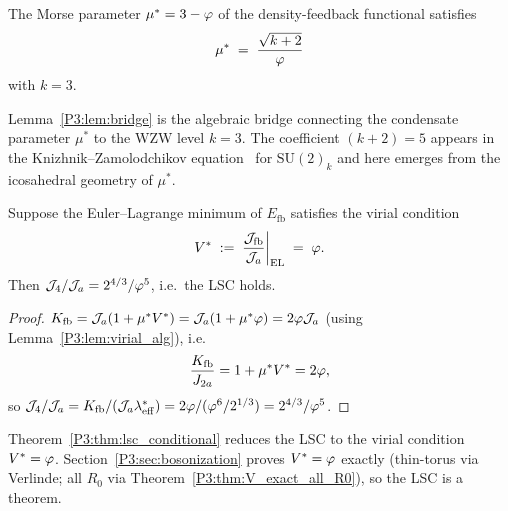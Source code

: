 \begin{lemma}
\label{P3:lem:bridge}
The Morse parameter $\mu^* = 3-\varphi$ of the density-feedback
functional satisfies
\begin{equation}
  \mu^* \;=\; \frac{\sqrt{k+2}}{\varphi}
  \label{P3:eq:bridge}
\end{equation}
with $k=3$.
\end{lemma}

\begin{remark}
\label{P3:rem:bridge_interpretation}
Lemma~\ref{P3:lem:bridge} is the algebraic bridge connecting the
condensate parameter $\mu^*$ to the WZW level $k=3$.
The coefficient $(k+2)=5$ appears in the Knizhnik--Zamolodchikov
equation~\cite{KZ1984} for $\mathrm{SU}(2)_k$ and here emerges
from the icosahedral geometry of $\mu^*$.
\end{remark}

\begin{theorem}
\label{P3:thm:lsc_conditional}
Suppose the Euler--Lagrange minimum of $E_{\mathrm{fb}}$ satisfies
the virial condition
\begin{equation}
  V^* \;:=\; \frac{\mathcal{J}_{\mathrm{fb}}}{\mathcal{J}_a}\bigg|_{\mathrm{EL}} \;=\; \varphi.
  \label{P3:eq:virial}
\end{equation}
Then $\mathcal{J}_4/\mathcal{J}_a = 2^{4/3}/\varphi^5$, i.e.\ the LSC holds.
\end{theorem}
\begin{proof}
$K_{\mathrm{fb}} = \mathcal{J}_a(1 + \mu^*V^*) = \mathcal{J}_a(1 + \mu^*\varphi) = 2\varphi\mathcal{J}_a$
(using Lemma~\ref{P3:lem:virial_alg}), i.e.\
\begin{equation}
  \frac{K_{\mathrm{fb}}}{J_{2a}} = 1+\mu^*V^* = 2\varphi,
  \label{P3:eq:kfb_simplified}
\end{equation}
so $\mathcal{J}_4/\mathcal{J}_a = K_{\mathrm{fb}}/(\mathcal{J}_a\lambda_{\mathrm{eff}}^*) = 2\varphi/(\varphi^6/2^{1/3}) = 2^{4/3}/\varphi^5$.
\end{proof}

\begin{remark}
\label{P3:rem:lsc_conditional_status}
Theorem~\ref{P3:thm:lsc_conditional} reduces the LSC to the virial
condition $V^*=\varphi$.  Section~\ref{P3:sec:bosonization} proves $V^*=\varphi$
exactly (thin-torus via Verlinde; all $R_0$ via Theorem~\ref{P3:thm:V_exact_all_R0}),
so the LSC is a theorem.
\end{remark}

